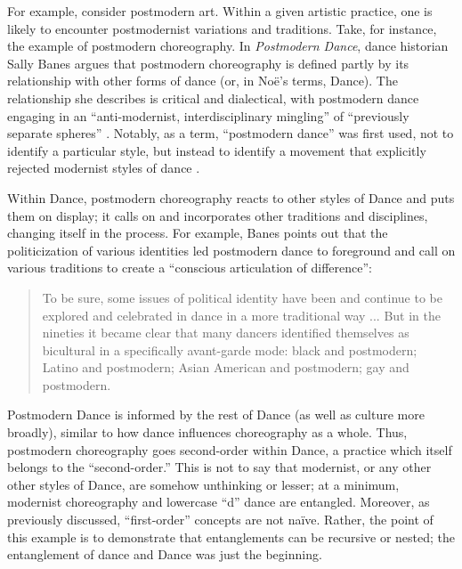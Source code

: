 \documentclass[12pt,letterpaper]{article}
\begin{document}
For example, consider postmodern art. Within a given artistic practice, one is
likely to encounter postmodernist variations and traditions. Take, for instance,
the example of postmodern choreography. In \textit{Postmodern Dance}, dance
historian Sally Banes argues that postmodern choreography is defined partly by
its relationship with other forms of dance (or, in Noë's terms, Dance). The
relationship she describes is critical and dialectical, with postmodern dance
engaging in an ``anti-modernist, interdisciplinary mingling'' of ``previously
separate spheres'' \autocite[154--155]{banesPostmodern1997}. Notably, as a term,
``postmodern dance'' was first used, not to identify a particular style, but
instead to identify a movement that explicitly rejected modernist styles of
dance \autocite[151]{banesPostmodern1997}.

Within Dance, postmodern choreography reacts to other styles of Dance and puts
them on display; it calls on and incorporates other traditions and disciplines,
changing itself in the process. For example, Banes points out that the
politicization of various identities led postmodern dance to foreground and call
on various traditions to create a ``conscious articulation of difference'':

\begin{quote}
    To be sure, some issues of political identity have been and continue to be
    explored and celebrated in dance in a more traditional way ... But in the
    nineties it became clear that many dancers identified themselves as
    bicultural in a specifically avant-garde mode: black and postmodern; Latino
    and postmodern; Asian American and postmodern; gay and postmodern.
    \autocite[154]{banesPostmodern1997}
\end{quote}

Postmodern Dance is informed by the rest of Dance (as well as culture
more broadly), similar to how dance influences choreography as a whole.  Thus,
postmodern choreography goes second-order within Dance, a practice which itself
belongs to the ``second-order.''  This is not to say that modernist, or any
other other styles of Dance, are somehow unthinking or lesser; at a minimum,
modernist choreography and lowercase ``d'' dance are entangled. Moreover, as
previously discussed, ``first-order'' concepts are not naïve. Rather, the point
of this example is to demonstrate that entanglements can be recursive or nested;
the entanglement of dance and Dance was just the beginning.
\end{document}
